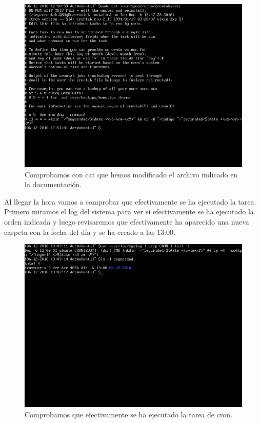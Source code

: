 \begin{figure}[H]
	\centering
	\includegraphics[scale=0.4]{cron-ubuLocation.png}
	\caption{Comprobamos con cat que hemos modificado el archivo indicado en la documentación.}
\end{figure}

Al llegar la hora vamos a comprobar que efectivamente se ha ejecutado la tarea. Primero miramos el log del sistema para ver si efectivamente se ha ejecutado la orden indicada y luego revisaremos que efectivamente ha aparecido una nueva carpeta con la fecha del día y se ha creado a las 13:00.

\begin{figure}[H]
	\centering
	\includegraphics[scale=0.4]{cron-ubuCheck.png}
	\caption{Comprobamos que efectivamente se ha ejecutado la tarea de cron.}
\end{figure}


